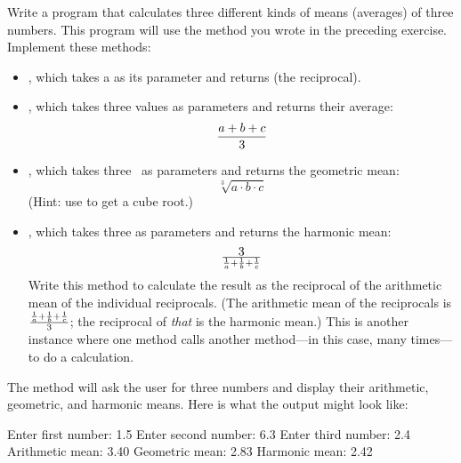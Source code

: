 \begin{exercise}
Write a program that calculates three different kinds of means (averages) of three numbers. This program will use the  method you wrote in the preceding exercise. Implement these methods:

\begin{itemize}
\item {}, which takes a  as its parameter and returns  (the reciprocal).
\item {}, which takes three  values as parameters and returns their average: 
\begin{equation*}
{{a + b + c}\over 3}
\end{equation*}
\item {}, which takes three \ as parameters and returns the geometric mean:
\begin{equation*}
\sqrt[3]{a\cdot b\cdot c}
\end{equation*}
(Hint: use  to get a cube root.)
\item {}, which takes three  as parameters and returns the harmonic mean:
\begin{equation*}
3\over {{1\over a} + {1\over b} + {1\over c}}
\end{equation*}
Write this method to calculate the result as the reciprocal of the arithmetic mean of the individual reciprocals.  (The arithmetic mean of the reciprocals is ${{1\over a} + {1\over b} + {1\over c}}\over 3$; the reciprocal of {\em that} is the harmonic mean.) This is another instance where one method calls another method---in this case, many times---to do a calculation.
\end{itemize}

The  method will ask the user for three numbers and display their arithmetic, geometric, and harmonic means. Here is what the output might look like:

\begin{stdout}
Enter first number: 1.5
Enter second number: 6.3
Enter third number: 2.4
Arithmetic mean: 3.40
Geometric mean:  2.83
Harmonic mean:   2.42
\end{stdout}

\end{exercise}

